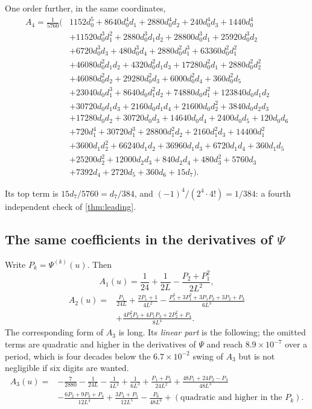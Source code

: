 \documentclass[11pt,oneside]{article}
\theoremstyle{definition}
\theoremstyle{remark}
\begin{document}
One order further, in the same coordinates,
\begin{equation}\label{eq:A4jets}
\begin{aligned}
  A_4=\frac{1}{5760}\bigl(&1152d_0^5+8640d_0^4d_1+2880d_0^4d_2+240d_0^4d_3+1440d_0^4\\
   &+11520d_0^3d_1^2+2880d_0^3d_1d_2+28800d_0^3d_1+25920d_0^3d_2\\
   &+6720d_0^3d_3+480d_0^3d_4+2880d_0^2d_1^3+63360d_0^2d_1^2\\
   &+46080d_0^2d_1d_2+4320d_0^2d_1d_3+17280d_0^2d_1+2880d_0^2d_2^2\\
   &+46080d_0^2d_2+29280d_0^2d_3+6000d_0^2d_4+360d_0^2d_5\\
   &+23040d_0d_1^3+8640d_0d_1^2d_2+74880d_0d_1^2+123840d_0d_1d_2\\
   &+30720d_0d_1d_3+2160d_0d_1d_4+21600d_0d_2^2+3840d_0d_2d_3\\
   &+17280d_0d_2+30720d_0d_3+14640d_0d_4+2400d_0d_5+120d_0d_6\\
   &+720d_1^4+30720d_1^3+28800d_1^2d_2+2160d_1^2d_3+14400d_1^2\\
   &+3600d_1d_2^2+66240d_1d_2+36960d_1d_3+6720d_1d_4+360d_1d_5\\
   &+25200d_2^2+12000d_2d_3+840d_2d_4+480d_3^2+5760d_3\\
   &+7392d_4+2720d_5+360d_6+15d_7\bigr).
\end{aligned}
\end{equation}

Its top term is $15d_7/5760=d_7/384$, and $(-1)^4/(2^4\cdot4!)=1/384$: a
fourth independent check of \cref{thm:leading}.

\subsection{The same coefficients in the derivatives of \texorpdfstring{$\Psi$}{Psi}}

Write $P_k=\Psi^{(k)}(u)$.  Then
\[
  A_1(u)=\frac1{24}+\frac1{2L}-\frac{P_2+P_1^2}{2L^2},
\]
\begin{equation}\label{eq:A2psi}
\begin{aligned}
  A_2(u)={}&\frac{P_1}{24L}
    +\frac{2P_1+1}{4L^2}
    -\frac{P_1^3+3P_1^2+3P_1P_2+3P_2+P_3}{6L^3}\\
   &+\frac{4P_1^2P_2+4P_1P_3+2P_2^2+P_4}{8L^4}.
\end{aligned}
\end{equation}
The corresponding form of $A_3$ is long.  Its \emph{linear part} is the
following; the omitted terms are quadratic and higher in the derivatives of
$\Psi$ and reach $8.9\times10^{-7}$ over a period, which is four decades
below the $6.7\times10^{-2}$ swing of $A_3$ but is not negligible if six
digits are wanted.
\begin{equation}\label{eq:A3psi}
\begin{aligned}
  A_3(u)={}&-\frac7{2880}-\frac1{24L}-\frac1{4L^2}+\frac1{6L^3}
    +\frac{P_1+P_2}{24L^2}
    +\frac{48P_1+24P_2-P_3}{48L^3}\\
   &-\frac{6P_2+9P_3+P_4}{12L^4}
    +\frac{3P_4+P_5}{12L^5}
    -\frac{P_6}{48L^6}
    +(\text{quadratic and higher in the }P_k).
\end{aligned}
\end{equation}
\end{document}

